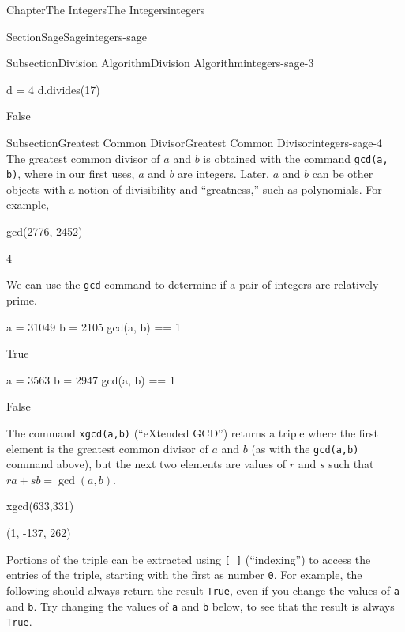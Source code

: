 \documentclass[oneside,10pt,]{book}
\newcommand{\mono}[1]{\texttt{#1}}
\numberwithin{equation}{section}
\begin{document}
\begin{chapterptx}{Chapter}{The Integers}{}{The Integers}{}{}{integers}
\begin{sectionptx}{Section}{Sage}{}{Sage}{}{}{integers-sage}
\begin{subsectionptx}{Subsection}{Division Algorithm}{}{Division Algorithm}{}{}{integers-sage-3}
\begin{sageinput}
d = 4
d.divides(17)
\end{sageinput}
\begin{sageoutput}
False
\end{sageoutput}
\end{subsectionptx}
%
%
\typeout{************************************************}
\typeout{************************************************}
%
\begin{subsectionptx}{Subsection}{Greatest Common Divisor}{}{Greatest Common Divisor}{}{}{integers-sage-4}
The greatest common divisor of \(a\) and \(b\) is obtained with the command \mono{gcd(a, b)}, where in our first uses, \(a\) and \(b\) are integers.  Later, \(a\) and \(b\) can be other objects with a notion of divisibility and ``greatness,'' such as polynomials.  For example,%
\begin{sageinput}
gcd(2776, 2452)
\end{sageinput}
\begin{sageoutput}
4
\end{sageoutput}
We can use the \mono{gcd} command to determine if a pair of integers are relatively prime.%
\begin{sageinput}
a = 31049
b = 2105
gcd(a, b) == 1
\end{sageinput}
\begin{sageoutput}
True
\end{sageoutput}
\begin{sageinput}
a = 3563
b = 2947
gcd(a, b) == 1
\end{sageinput}
\begin{sageoutput}
False
\end{sageoutput}
The command \mono{xgcd(a,b)} (``eXtended GCD'') returns a triple where the first element is the greatest common divisor of \(a\) and \(b\) (as with the \mono{gcd(a,b)} command above), but the next two elements are values of \(r\) and \(s\) such that \(ra+sb=\gcd(a,b)\).%
\begin{sageinput}
xgcd(633,331)
\end{sageinput}
\begin{sageoutput}
(1, -137, 262)
\end{sageoutput}
Portions of the triple can be extracted using \mono{[ ]} (``indexing'') to access the entries of the triple, starting with the first as number \mono{0}.  For example, the following should always return the result \mono{True}, even if you change the values of \mono{a} and \mono{b}.  Try changing the values of \mono{a} and \mono{b} below, to see that the result is always \mono{True}.%

\end{subsectionptx}
\end{sectionptx}
\end{chapterptx}
\end{document}
